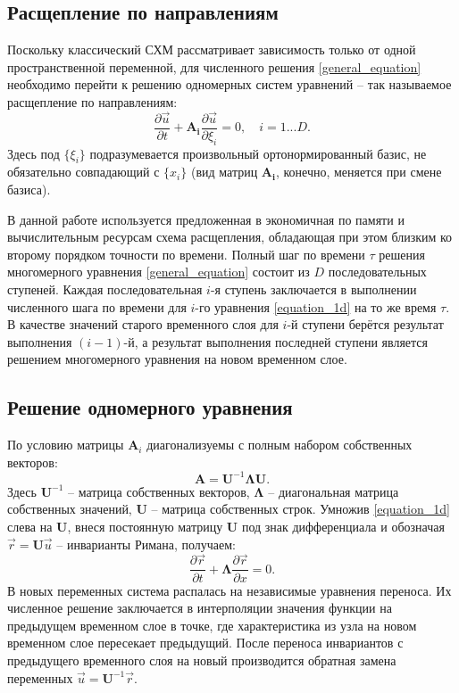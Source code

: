 \subsection{Расщепление по направлениям}
Поскольку классический СХМ рассматривает зависимость только от одной пространственной переменной,
для численного решения \eqref{general_equation} необходимо
перейти к решению одномерных систем уравнений -- так называемое расщепление по направлениям:
\begin{equation}
\label{equation_1d}
	\frac{\partial\vec{u}}{\partial{t}}+\mathbf{A_i}\frac{\partial\vec{u}}{\partial{\xi_i}} = 0, \quad i = 1 ... D.
\end{equation}
Здесь под $\{\xi_i\}$ подразумевается произвольный ортонормированный базис, 
не обязательно совпадающий с $\{x_i\}$ 
(вид матриц $\mathbf{A_i}$, конечно, меняется при смене базиса).

В данной работе используется предложенная в \cite{chelnokov}
экономичная по памяти и вычислительным ресурсам схема расщепления, 
обладающая при этом близким ко второму порядком точности по времени.
Полный шаг по времени $\tau$ решения многомерного уравнения \eqref{general_equation} 
состоит из $D$ последовательных ступеней. 
Каждая последовательная $i$-я ступень заключается в выполнении численного шага по времени
для $i$-го уравнения \eqref{equation_1d} на то же время $\tau$. 
В качестве значений старого временного слоя для $i$-й ступени 
берётся результат выполнения $(i-1)$-й, 
а результат выполнения последней ступени является решением 
многомерного уравнения на новом временном слое. 


\subsection{Решение одномерного уравнения}
По условию матрицы $\mathbf{A}_i$ диагонализуемы с полным набором собственных векторов:
\begin{equation}
	\label{diagonal_view}
	\mathbf{A} = \mathbf{U}^{-1}\mathbf{\Lambda}\mathbf{U}.
\end{equation}
Здесь $\mathbf{U}^{-1}$ -- матрица собственных векторов, 
$\mathbf{\Lambda}$ -- диагональная матрица собственных значений,
$\mathbf{U}$ -- матрица собственных строк.
Умножив \eqref{equation_1d} слева на $\mathbf{U}$, 
внеся постоянную матрицу $\mathbf{U}$ под знак дифференциала
и обозначая $\vec{r} = \mathbf{U}\vec{u}$ -- инварианты Римана, получаем:
\begin{equation}
	\label{in_riemann_invariants}
	\frac{\partial\vec{r}}{\partial{t}}+\mathbf{\Lambda}\frac{\partial\vec{r}}{\partial{x}} = 0.
\end{equation}
В новых переменных система распалась на независимые уравнения переноса.
Их численное решение заключается в интерполяции значения функции
на предыдущем временном слое в точке, где характеристика из узла 
на новом временном слое пересекает предыдущий. 
После переноса инвариантов с предыдущего временного слоя на новый
производится обратная замена переменных $\vec{u} = \mathbf{U}^{-1}\vec{r}$.

